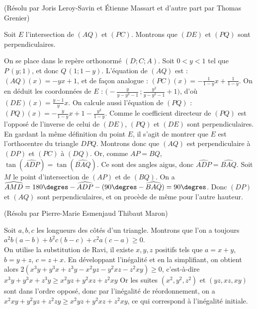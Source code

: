 \begin{sol}[67](Résolu par Joris Leroy-Savin et \'Etienne Massart et d'autre part par Thomas Grenier)

Soit $E$ l'intersection de $(AQ)$ et $(PC)$. Montrons que $(DE)$ et $(PQ)$
sont perpendiculaires.

On se place dans le repère orthonormé $(D;C;A)$. Soit $0<y<1$ tel que 
$P\,(y;1)$, et donc $Q\,(1;1-y)$.
L'équation de $(AQ)$ est : $(AQ)(x)=-yx+1$, et de façon analogue : 
$(PC)(x)=-\frac{1}{1-y}x+\frac{1}{1-y}$.
On en déduit les coordonnées de $E$ : $\bigg(-\frac{y}{y-y^2-1}\,;
\frac{y^2}{y-y^2-1}+1\bigg)$, d'où $(DE)(x)=\frac{y-1}{y}x$.
On calcule aussi l'équation de $(PQ)$ : 
$(PQ)(x) = -\frac{y}{1-y}x+1-\frac{y^2}{1-y}$.
Comme le coefficient directeur de $(PQ)$ est l'opposé de l'inverse de
celui de $(DE)$, $(PQ)$ et $(DE)$ sont perpendiculaires.\\
 
\; En gardant la même définition du point $E$,
il s'agit de montrer que $E$ est l'orthocentre du triangle $DPQ$. Montrons
donc que $(AQ)$ est perpendiculaire à $(DP)$ et $(PC)$ à $(DQ)$. Or, comme
$AP=BQ$, $\tan(\widehat{ADP})=\tan(\widehat{BAQ})$. Ce sont des angles aigus,
donc $\widehat{ADP}=\widehat{BAQ}$. Soit $M$ le point d'intersection
de $(AP)$ et de $(BQ)$. 
On a $\widehat{AMD}=180\degres - \widehat{ADP}
 - (90\degres-\widehat{BAQ})=90\degres$. Donc $(DP)$ et $(AQ)$ sont 
 perpendiculaires, et on procède de même pour l'autre hauteur.

\end{sol}

\begin{sol}[69](Résolu par Pierre-Marie Esmenjaud Thibaut Maron)

Soit $a,b,c$ les longueurs des côtés d'un triangle. Montrons que l'on a toujours $a^2b(a-b)+b^2c(b-c)+c^2a(c-a) \geq 0$.\\
On utilise la substitution de Ravi, il existe $x,y,z$ positifs tels que 
$a=x+y$,$b=y+z$, $c=z+x$.
En développant l'inégalité et en la simplifiant, on obtient alors
$2(x^3y+y^3x+z^3y-x^2yz-y^2xz-z^2xy) \geq 0$,
c'est-\`a-dire $x^3y+y^3x+z^3y \geq x^2yz+y^2xz+z^2xy$
Or les suites $(x^2,y^2,z^2)$ et $(yz,xz,xy)$ sont dans l'ordre opposé, donc par l'in\'egalit\'e de r\'eordonnement,
on a $x^2xy+y^2yz+z^2zy \geq x^2yz+y^2xz+z^2xy$, ce qui correspond \`a l'in\'egalit\'e initiale.

\end{sol}


